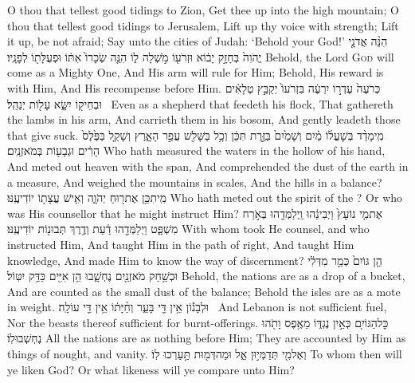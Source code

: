 {O thou that tellest good tidings to Zion, Get thee up into the high mountain; O thou that tellest good tidings to Jerusalem, Lift up thy voice with strength; Lift it up, be not afraid; Say unto the cities of Judah: ‘Behold your God!’}
{הִנֵּ֨ה אֲדֹנָ֤י יֱהֹוִה֙ בְּחָזָ֣ק יָב֔וֹא וּזְרֹע֖וֹ מֹ֣שְׁלָה ל֑וֹ הִנֵּ֤ה שְׂכָרוֹ֙ אִתּ֔וֹ וּפְעֻלָּת֖וֹ לְפָנָֽיו׃}
{Behold, the Lord \textsc{God} will come as a Mighty One, And His arm will rule for Him; Behold, His reward is with Him, And His recompense before Him.}
{כְּרֹעֶה֙ עֶדְר֣וֹ יִרְעֶ֔ה בִּזְרֹעוֹ֙ יְקַבֵּ֣ץ טְלָאִ֔ים וּבְחֵיק֖וֹ יִשָּׂ֑א עָל֖וֹת יְנַהֵֽל׃ \setuma }
{Even as a shepherd that feedeth his flock, That gathereth the lambs in his arm, And carrieth them in his bosom, And gently leadeth those that give suck.}
{מִֽי\maqqaf מָדַ֨ד בְּשׇׁעֳל֜וֹ מַ֗יִם וְשָׁמַ֙יִם֙ בַּזֶּ֣רֶת תִּכֵּ֔ן וְכָ֥ל בַּשָּׁלִ֖שׁ עֲפַ֣ר הָאָ֑רֶץ וְשָׁקַ֤ל בַּפֶּ֙לֶס֙ הָרִ֔ים וּגְבָע֖וֹת בְּמֹאזְנָֽיִם׃}
{Who hath measured the waters in the hollow of his hand, And meted out heaven with the span, And comprehended the dust of the earth in a measure, And weighed the mountains in scales, And the hills in a balance?}
{מִֽי\maqqaf תִכֵּ֥ן אֶת\maqqaf ר֖וּחַ יְהֹוָ֑ה וְאִ֖ישׁ עֲצָת֥וֹ יוֹדִיעֶֽנּוּ׃}
{Who hath meted out the spirit of the \lord? Or who was His counsellor that he might instruct Him?}
{אֶת\maqqaf מִ֤י נוֹעָץ֙ וַיְבִינֵ֔הוּ וַֽיְלַמְּדֵ֖הוּ בְּאֹ֣רַח מִשְׁפָּ֑ט וַיְלַמְּדֵ֣הוּ דַ֔עַת וְדֶ֥רֶךְ תְּבוּנ֖וֹת יוֹדִיעֶֽנּוּ׃}
{With whom took He counsel, and who instructed Him, And taught Him in the path of right, And taught Him knowledge, And made Him to know the way of discernment?}
{הֵ֤ן גּוֹיִם֙ כְּמַ֣ר מִדְּלִ֔י וּכְשַׁ֥חַק מֹאזְנַ֖יִם נֶחְשָׁ֑בוּ הֵ֥ן אִיִּ֖ים כַּדַּ֥ק יִטּֽוֹל׃}
{Behold, the nations are as a drop of a bucket, And are counted as the small dust of the balance; Behold the isles are as a mote in weight.}
{וּלְבָנ֕וֹן אֵ֥ין דֵּ֖י בָּעֵ֑ר וְחַ֨יָּת֔וֹ אֵ֥ין דֵּ֖י עוֹלָֽה׃ \petucha }
{And Lebanon is not sufficient fuel, Nor the beasts thereof sufficient for burnt-offerings.}
{כׇּל\maqqaf הַגּוֹיִ֖ם כְּאַ֣יִן נֶגְדּ֑וֹ מֵאֶ֥פֶס וָתֹ֖הוּ נֶחְשְׁבוּ\maqqaf לֽוֹ׃}
{All the nations are as nothing before Him; They are accounted by Him as things of nought, and vanity.}
{וְאֶל\maqqaf מִ֖י תְּדַמְּי֣וּן אֵ֑ל וּמַה\maqqaf דְּמ֖וּת תַּ֥עַרְכוּ לֽוֹ׃}
{To whom then will ye liken God? Or what likeness will ye compare unto Him?}
